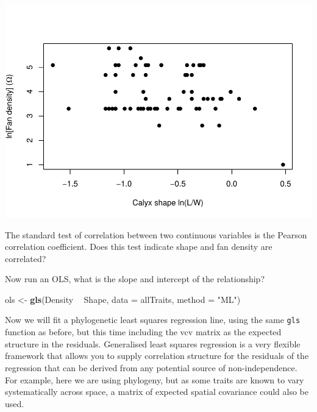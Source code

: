 \documentclass[]{article}
\newenvironment{Shaded}{\begin{snugshade}}{\end{snugshade}}
\newcommand{\KeywordTok}[1]{\textcolor[rgb]{0.13,0.29,0.53}{\textbf{#1}}}
\newcommand{\DataTypeTok}[1]{\textcolor[rgb]{0.13,0.29,0.53}{#1}}
\newcommand{\StringTok}[1]{\textcolor[rgb]{0.31,0.60,0.02}{#1}}
\newcommand{\OperatorTok}[1]{\textcolor[rgb]{0.81,0.36,0.00}{\textbf{#1}}}
\newcommand{\NormalTok}[1]{#1}
\begin{document}
\includegraphics{module_08_files/figure-latex/unnamed-chunk-9-1.pdf}

The standard test of correlation between two continuous variables is the
Pearson correlation coefficient. Does this test indicate shape and fan
density are correlated?

\begin{Shaded}
\end{Shaded}

Now run an OLS, what is the slope and intercept of the relationship?

\begin{Shaded}
\begin{Highlighting}[]
\NormalTok{ols <-}\StringTok{ }\KeywordTok{gls}\NormalTok{(Density }\OperatorTok{~}\StringTok{ }\NormalTok{Shape, }
           \DataTypeTok{data =}\NormalTok{ allTraits, }\DataTypeTok{method =} \StringTok{"ML"}\NormalTok{)}
\end{Highlighting}
\end{Shaded}

Now we will fit a phylogenetic least squares regression line, using the
same \texttt{gls} function as before, but this time including the vcv
matrix as the expected structure in the residuals. Generalised least
squares regression is a very flexible framework that allows you to
supply correlation structure for the residuals of the regression that
can be derived from any potential source of non-independence. For
example, here we are using phylogeny, but as some traits are known to
vary systematically across space, a matrix of expected spatial
covariance could also be used.
\end{document}
